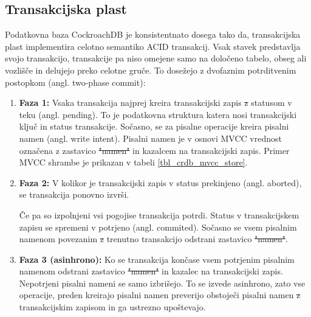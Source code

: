 \documentclass[a4paper, 12pt]{book}
\providecommand{\DIFaddtex}[1]{{\protect\color{blue}\uwave{#1}}} %
\providecommand{\DIFdeltex}[1]{{\protect\color{red}\sout{#1}}}                      %
\providecommand{\DIFaddbegin}{} %
\providecommand{\DIFaddend}{} %
\providecommand{\DIFdelbegin}{} %
\providecommand{\DIFdelend}{} %
\providecommand{\DIFadd}[1]{\texorpdfstring{\DIFaddtex{#1}}{#1}} %
\providecommand{\DIFdel}[1]{\texorpdfstring{\DIFdeltex{#1}}{}} %
\newcommand{\DIFscaledelfig}{0.5}
\newlength{\DIFdelgraphicswidth} %
\newlength{\DIFdelgraphicsheight} %
\newcommand{\DIFaddincludegraphics}[2][]{{\color{blue}\fbox{\DIFOincludegraphics[#1]{#2}}}} %
\newcommand{\DIFdelincludegraphics}[2][]{%
\sbox{\DIFdelgraphicsbox}{\DIFOincludegraphics[#1]{#2}}%
\settoboxwidth{\DIFdelgraphicswidth}{\DIFdelgraphicsbox} %
\settoboxtotalheight{\DIFdelgraphicsheight}{\DIFdelgraphicsbox} %
\scalebox{\DIFscaledelfig}{%
\parbox[b]{\DIFdelgraphicswidth}{\usebox{\DIFdelgraphicsbox}\\[-\baselineskip] \rule{\DIFdelgraphicswidth}{0em}}\llap{\resizebox{\DIFdelgraphicswidth}{\DIFdelgraphicsheight}{%
\setlength{\unitlength}{\DIFdelgraphicswidth}%
\begin{picture}(1,1)%
\thicklines\linethickness{2pt} %
{\color[rgb]{1,0,0}\put(0,0){\framebox(1,1){}}}%
{\color[rgb]{1,0,0}\put(0,0){\line( 1,1){1}}}%
{\color[rgb]{1,0,0}\put(0,1){\line(1,-1){1}}}%
\end{picture}%
}\hspace*{3pt}}} %
} %
\DeclareRobustCommand{\DIFaddbegin}{\DIFOaddbegin \let\includegraphics\DIFaddincludegraphics} %
\DeclareRobustCommand{\DIFaddend}{\DIFOaddend \let\includegraphics\DIFOincludegraphics} %
\DeclareRobustCommand{\DIFdelbegin}{\DIFOdelbegin \let\includegraphics\DIFdelincludegraphics} %
\DeclareRobustCommand{\DIFdelend}{\DIFOaddend \let\includegraphics\DIFOincludegraphics} %
\begin{document}
\subsection{Transakcijska plast}
Podatkovna baza CockroachDB je konsistentna\DIFaddbegin \DIFadd{, }\DIFaddend to dosega tako da, transakcijska plast implementira celotno semantiko ACID transakcij. Vsak stavek predstavlja svojo transakcijo, transakcije pa niso omejene samo na določeno tabelo, obseg ali vozlišče in delujejo preko celotne gruče. To dosežejo z dvofaznim potrditvenim postopkom (angl. two-phase commit):

\begin{enumerate}
    \item \textbf{Faza 1:} Vsaka transakcija najprej kreira transakcijski zapis \DIFdelbegin \DIFdel{z }\DIFdelend \DIFaddbegin \DIFadd{s }\DIFaddend statusom v teku (angl. pending). To je podatkovna struktura katera nosi transakcijski ključ in status transakcije. Sočasno, se za pisalne operacije kreira pisalni namen (angl. write intent). Pisalni namen je v osnovi MVCC vrednost označena z zastavico \DIFdelbegin \DIFdel{"namen" }\DIFdelend \DIFaddbegin \texttt{\DIFadd{<intent>}} \DIFaddend in kazalcem na transakcijski zapis. Primer MVCC shrambe je prikazan v tabeli \ref{tbl_crdb_mvcc_store}.
    \item \textbf{Faza 2:} V kolikor je transakcijski zapis v status prekinjeno (angl. aborted), se transakcija ponovno izvrši.

    Če pa so izpolnjeni vsi pogoji\DIFaddbegin \DIFadd{, }\DIFaddend se transakcija potrdi. Status v transakcijskem zapisu se spremeni v potrjeno (angl. commited). Sočasno se vsem pisalnim namenom povezanim \DIFdelbegin \DIFdel{z }\DIFdelend \DIFaddbegin \DIFadd{s }\DIFaddend trenutno transakcijo odstrani zastavico \DIFdelbegin \DIFdel{"namen"}\DIFdelend \DIFaddbegin \texttt{\DIFadd{<intent>}}\DIFaddend . 
    \item \textbf{Faza 3 (asinhrono):} Ko se transakcija konča\DIFaddbegin \DIFadd{, }\DIFaddend se vsem potrjenim pisalnim namenom odstrani zastavico \DIFdelbegin \DIFdel{"namen" }\DIFdelend \DIFaddbegin \texttt{\DIFadd{<intent>}} \DIFaddend in kazalec na transakcijski zapis. Nepotrjeni pisalni nameni se samo izbrišejo. To se izvede asinhrono, zato vse operacije, preden kreirajo pisalni namen preverijo obstoječi pisalni namen \DIFdelbegin \DIFdel{z }\DIFdelend \DIFaddbegin \DIFadd{s }\DIFaddend transakcijskim zapisom in ga ustrezno upoštevajo.
\end{enumerate}
\end{document}
